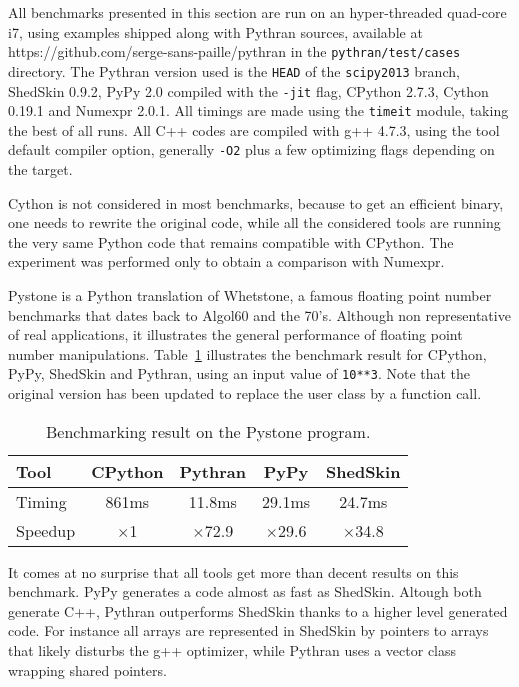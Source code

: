 \documentclass[10pt, onecolumn, preprint]{sigplanconf}
\begin{document}
All benchmarks presented in this section are run on an hyper-threaded quad-core
i7, %
using examples shipped along with Pythran sources, available at
https://github.com/serge-sans-paille/pythran in the \texttt{pythran/test/cases}
directory. The Pythran version used is the \texttt{HEAD} of the \texttt{scipy2013} branch,
ShedSkin 0.9.2, PyPy 2.0 compiled with the \texttt{-jit} flag, CPython 2.7.3, Cython
0.19.1 and Numexpr 2.0.1. All timings are made using the \texttt{timeit} module,
taking the best of all runs. All C++ codes are compiled with g++ 4.7.3, using
the tool default compiler option, generally \texttt{-O2} plus a few optimizing flags
depending on the target.

Cython is not considered in most benchmarks, because to get an efficient
binary, one needs to rewrite the original code, while all the considered tools
are running the very same Python code that remains compatible with CPython. The
experiment was performed only to obtain a comparison with Numexpr.

Pystone is a Python translation of Whetstone, a famous floating point number
benchmarks that dates back to Algol60 and the 70's. Although non representative
of real applications, it illustrates the general performance of floating point
number manipulations. Table~\ref{tbl:pystone}  illustrates the benchmark
result for CPython, PyPy, ShedSkin and Pythran, using an input value of
\texttt{10**3}. Note that the original version has been updated to replace the user
class by a function call.

\begin{table}
    \centering

    \begin{tabular}{|l|c|c|c|c|}
        \hline
     Tool    &  CPython    &   Pythran     &     PyPy   &  ShedSkin  \\
    \hline
     Timing  &  861ms      &   11.8ms      &     29.1ms &  24.7ms    \\
    \hline
     Speedup &  $\times$1         &   $\times$72.9       &    $\times$29.6   &  $\times$34.8     \\
    \hline
\end{tabular}

    \caption{Benchmarking result on the Pystone program.}
    \label{tbl:pystone}

\end{table}

It comes at no surprise that all tools get more than decent results on this
benchmark. PyPy generates a code almost as fast %
as ShedSkin. Altough both
generate C++, Pythran outperforms ShedSkin thanks to a higher level generated
code. For instance all arrays are represented in ShedSkin by pointers to arrays
that likely disturbs the g++ optimizer, while Pythran uses a vector class wrapping
shared pointers.
\end{document}
